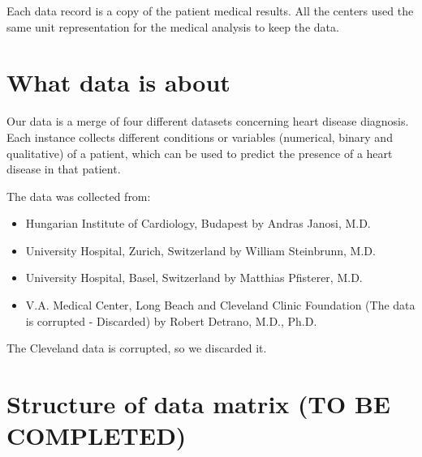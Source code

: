 \documentclass[a4paper,12pt]{article}
\begin{document}
    Each data record is a copy of the patient medical results. All the centers used the same unit representation for the medical analysis to keep the data.

\section{What data is about}

    Our data is a merge of four different datasets concerning heart disease diagnosis.
    Each instance collects different conditions or variables (numerical, binary and qualitative) of a patient,
    which can be used to predict the presence of a heart disease in that patient.
    
    The data was collected from:

    \begin{itemize}

        \item Hungarian Institute of Cardiology, Budapest by Andras Janosi, M.D.
        \item University Hospital, Zurich, Switzerland by William Steinbrunn, M.D.
        \item University Hospital, Basel, Switzerland by Matthias Pfisterer, M.D.
        \item V.A. Medical Center, Long Beach and Cleveland Clinic Foundation (The data is corrupted - Discarded) by Robert Detrano, M.D., Ph.D.

    \end{itemize}

    The Cleveland data is corrupted, so we discarded it.

\section{Structure of data matrix (\textbf{TO BE COMPLETED})}
\end{document}
